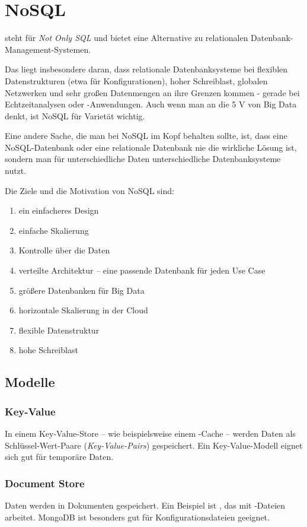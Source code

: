 \section{NoSQL}
 steht für \emph{Not Only SQL} und bietet eine Alternative zu relationalen Datenbank-Management-Systemen.

Das liegt insbesondere daran, dass relationale Datenbanksysteme bei flexiblen Datenstrukturen (etwa für Konfigurationen), hoher Schreiblast, globalen Netzwerken und sehr großen Datenmengen an ihre Grenzen kommen - gerade bei Echtzeitanalysen oder -Anwendungen. Auch wenn man an die 5 V von Big Data denkt, ist NoSQL für Varietät wichtig.

Eine andere Sache, die man bei NoSQL im Kopf behalten sollte, ist, dass eine NoSQL-Datenbank oder eine relationale Datenbank nie die wirkliche Lösung ist, sondern man für unterschiedliche Daten unterschiedliche Datenbanksysteme nutzt.

Die Ziele und die Motivation von NoSQL sind:
\begin{enumerate}[leftmargin=*]
  \item ein einfacheres Design
  \item einfache Skalierung
  \item Kontrolle über die Daten
  \item verteilte Architektur -- eine passende Datenbank für jeden Use Case
  \item größere Datenbanken für Big Data
  \item horizontale Skalierung in der Cloud
  \item flexible Datenstruktur
  \item hohe Schreiblast
\end{enumerate}

\subsection{Modelle}
\subsubsection{Key-Value}
In einem Key-Value-Store -- wie beispielsweise einem -Cache -- werden Daten als Schlüssel-Wert-Paare (\emph{Key-Value-Pairs}) gespeichert. Ein Key-Value-Modell eignet sich gut für temporäre Daten.

\subsubsection{Document Store}
Daten werden in Dokumenten gespeichert. Ein Beispiel ist , das mit -Dateien arbeitet. MongoDB ist besonders gut für Konfigurationsdateien geeignet.

